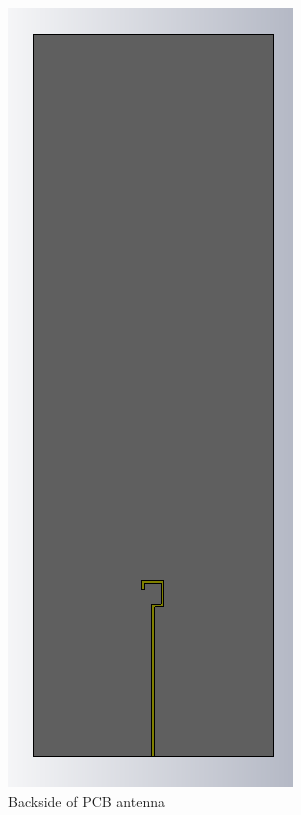 \begin{figure}[H]
\begin{minipage}[b]{0.4\textwidth}
\includegraphics[scale = 0.5]{figures/measurement/antenna_back.png}
\caption{Backside of PCB antenna}
    \label{fig:ant_back}
  \end{minipage}
\end{figure}


